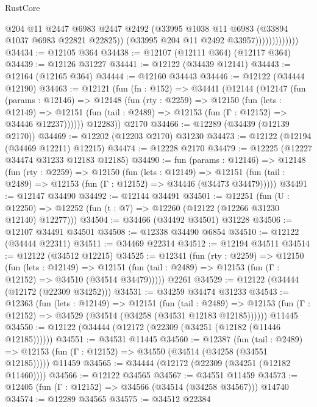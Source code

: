 \begin{lexlean}{RustCore}
\begin{coremodule}
                            @204
                            @11
                            @2447
                            @6983
                            @2447
                            @2492
                            (@33995 @1038 @11 @6983 (@33894 @1037 @6983 @22821 @22825))
                            (@33995 @204 @11 @2492 @33957)))))))))))))
@34434 := @12105 @364
@34438 := @12107 (@12111 @364) (@12117 @364)
@34439 := @12126 @31227
@34441 := @12122 (@34439 @12141)
@34443 := @12164 (@12165 @364)
@34444 := @12160 @34443
@34446 := @12122 (@34444 @12190)
@34463 := @12121
    (fun (fn : @152) =>
    @34441
      (@12144
        (@12147
          (fun (params : @12146) =>
          @12148
            (fun (rty : @2259) =>
            @12150
              (fun (lets : @12149) =>
              @12151 (fun (tail : @2489) => @12153 (fun (Γ : @12152) => @34446 @12237))))))
        @12283))
    @2170
@34466 := @12289 (@34439 (@12139 @2170))
@34469 := @12202 (@12203 @2170) @31230
@34473 := @12122 (@12194 (@34469 @12211) @12215)
@34474 := @12228 @2170
@34479 := @12225 (@12227 @34474 @31233 @12183 @12185)
@34490 := fun (params : @12146) =>
  @12148
    (fun (rty : @2259) =>
    @12150
      (fun (lets : @12149) =>
      @12151 (fun (tail : @2489) => @12153 (fun (Γ : @12152) => @34446 (@34473 @34479)))))
@34491 := @12147 @34490
@34492 := @12144 @34491
@34501 := @12251
    (fun (U : @12250) => @12252 (fun (t : @7) => @12260 (@12122 (@12266 @31230 @12140) @12277)))
@34504 := @34466 (@34492 @34501) @31228
@34506 := @12107 @34491 @34501
@34508 := @12338 @34490 @6854
@34510 := @12122 (@34444 @22311)
@34511 := @34469 @22314
@34512 := @12194 @34511
@34514 := @12122 (@34512 @12215)
@34525 := @12341
    (fun (rty : @2259) =>
    @12150
      (fun (lets : @12149) =>
      @12151 (fun (tail : @2489) => @12153 (fun (Γ : @12152) => @34510 (@34514 @34479)))))
    @2261
@34529 := @12122 (@34444 (@12172 (@22309 @34252)))
@34531 := @34259 @34474 @31233
@34543 := @12363
    (fun (lets : @12149) =>
    @12151
      (fun (tail : @2489) =>
      @12153 (fun (Γ : @12152) => @34529 (@34514 (@34258 (@34531 @12183 @12185))))))
    @11445
@34550 := @12122 (@34444 (@12172 (@22309 (@34251 (@12182 (@11446 @12185))))))
@34551 := @34531 @11445
@34560 := @12387
    (fun (tail : @2489) => @12153 (fun (Γ : @12152) => @34550 (@34514 (@34258 (@34551 @12185)))))
    @11459
@34565 := @34444 (@12172 (@22309 (@34251 (@12182 @11460))))
@34566 := @12122 @34565
@34567 := @34551 @11459
@34573 := @12405 (fun (Γ : @12152) => @34566 (@34514 (@34258 @34567))) @14740
@34574 := @12289 @34565
@34575 := @34512 @22384

\end{coremodule}
\end{lexlean}
